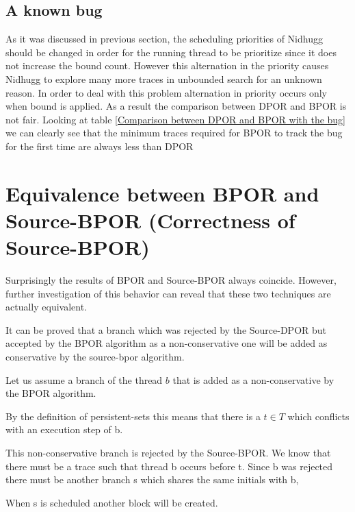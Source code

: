 \subsection{A known bug}
As it was discussed in previous section, the scheduling priorities of Nidhugg should be changed in order for the running thread to be prioritize since it does not
increase the bound count. However this alternation in the priority causes Nidhugg to explore many more traces in unbounded search for an unknown reason. In order to deal with
this problem alternation in priority occurs only when bound is applied. As a result the comparison between DPOR and BPOR is not fair. Looking at table \ref{Comparison between DPOR and BPOR with the bug}
we can clearly see that the minimum traces required for BPOR to track the bug for the first time are always less than DPOR


\section{Equivalence between BPOR and Source-BPOR (Correctness of Source-BPOR)}
Surprisingly the results of BPOR and Source-BPOR always coincide. However, further investigation of this behavior can reveal that these two techniques
are actually equivalent. 

It can be proved that a branch which was rejected by the Source-DPOR but accepted by the BPOR algorithm as a non-conservative one will be added as 
conservative by the source-bpor algorithm.

Let us assume a branch of the thread $b$ that is added as a non-conservative by the BPOR algorithm.

By the definition of persistent-sets this means that there is a $t \in T$ which
conflicts with an execution step of b. 

This non-conservative branch is rejected by the Source-BPOR. We know that there must be
 a trace such that thread b occurs before t. Since b was rejected there must be another branch s which shares the same initials
  with b, 
  
When s is scheduled another block will be created.
 
